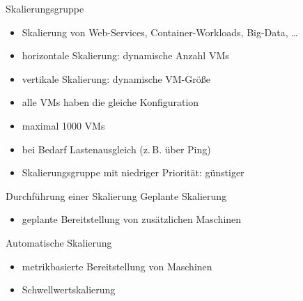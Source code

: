 

\begin{flashcard}[Definition]{Skalierungsgruppe}
    \begin{itemize}
        \item Skalierung von Web-Services, Container-Workloads, Big-Data, \ldots
        \item horizontale Skalierung: dynamische Anzahl VMs
        \item vertikale Skalierung: dynamische VM-Größe
        \item alle VMs haben die gleiche Konfiguration
        \item maximal 1000 VMs
        \item bei Bedarf Lastenausgleich (z.\,B. über Ping)
        \item Skalierungsgruppe mit niedriger Priorität: günstiger
    \end{itemize}
\end{flashcard}

\begin{flashcard}[Definition]{Durchführung einer Skalierung}
    Geplante Skalierung
    \begin{itemize}
        \item geplante Bereitstellung von zusätzlichen Maschinen
    \end{itemize}
    \vspace{1cm}
    Automatische Skalierung
    \begin{itemize}
        \item metrikbasierte Bereitstellung von Maschinen
        \item Schwellwertskalierung
    \end{itemize}

\end{flashcard}

